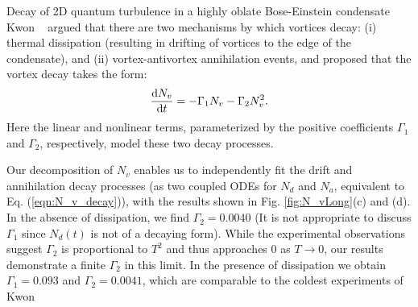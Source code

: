 \begin{chapter}{\label{cha:shin}Decay of 2D quantum turbulence in a highly oblate Bose-Einstein condensate}
  Kwon {\etal}~\citep{kwon_moon_14} argued that there are two mechanisms 
by which vortices decay: (i) thermal dissipation
(resulting in drifting of vortices to the edge of the condensate),
and (ii) vortex-antivortex annihilation events, and proposed
that the vortex decay takes the form:
\begin{equation}
\frac{{\rm d}N_v}{{\rm d}t}= - \Gamma_1 N_v - \Gamma_2 N_v^2.
\label{eqn:N_v_decay}
\end{equation}
Here the linear and nonlinear terms, parameterized by the positive
coefficients $\Gamma_1$ and $\Gamma_2$, respectively, model
these two decay processes.  

Our decomposition of $N_v$ enables us to independently fit the drift and annihilation decay processes (as two coupled ODEs for $N_d$ and $N_a$, equivalent to Eq. (\ref{eqn:N_v_decay})), with the results shown in Fig. \ref{fig:N_vLong}(c) and (d).  In the absence of dissipation, we find $\Gamma_{2} = 0.0040$ (It is not appropriate to discuss $\Gamma_1$ since $N_d(t)$ is not of a decaying form). While the experimental observations \cite{kwon_moon_14} suggest $\Gamma_2$ is proportional to $T^2$ and thus approaches 0 as $T\rightarrow0$, our results demonstrate a finite $\Gamma_2$ in this limit.  In the presence of dissipation we obtain $\Gamma_{1} = 0.093$ and $\Gamma_{2} = 0.0041$, which are comparable to the coldest experiments of Kwon \etal


\end{chapter}
